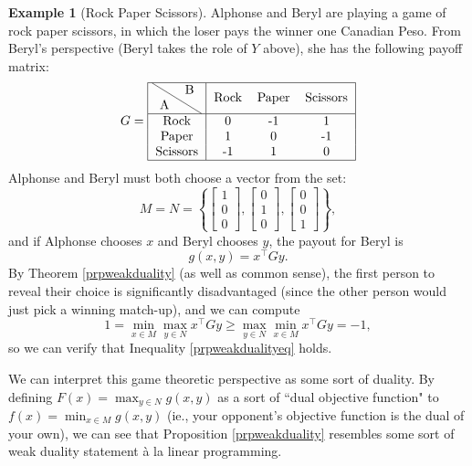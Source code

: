 \documentclass{article}
\numberwithin{equation}{section}
\theoremstyle{definition}
\newtheorem{example}[theorem]{Example}
\begin{document}
\begin{example}[Rock Paper Scissors]
    Alphonse and Beryl are playing a game of rock paper scissors, in which the loser pays the winner one Canadian Peso. From Beryl's perspective (Beryl takes the role of $Y$ above), she has the following payoff matrix:
    \begin{equation}
        G=\begin{tabular}{|c|ccc|}
            \hline
                \backslashbox{A}{B}&Rock&Paper&Scissors\\\hline 
                Rock & 0 & -1 & 1 \\
                Paper & 1 & 0 & -1 \\
                Scissors & -1 & 1 & 0\\\hline
            \end{tabular}
    \end{equation}
    Alphonse and Beryl must both choose a vector from the set:
    \begin{equation}
        M=N=\left\{\begin{bmatrix} 1\\ 0\\ 0\end{bmatrix},
        \begin{bmatrix} 0\\ 1\\ 0\end{bmatrix},
        \begin{bmatrix} 0\\ 0\\ 1\end{bmatrix}\right\},
    \end{equation}
    and if Alphonse chooses $x$ and Beryl chooses $y$, the payout for Beryl is
    \begin{equation}
        g(x,y)=x^\top Gy.
    \end{equation}
    By Theorem \ref{prpweakduality} (as well as common sense), the first person to reveal their choice is significantly disadvantaged (since the other person would just pick a winning match-up), and we can compute
    \begin{equation}
        1=\min_{x\in M}\max_{y\in N} x^\top Gy\ge \max_{y\in N}\min_{x\in M} x^\top Gy=-1,
    \end{equation}
    so we can verify that Inequality \ref{prpweakdualityeq} holds.
\end{example}

We can interpret this game theoretic perspective as some sort of duality. By defining  $F(x)=\max_{y\in N}g(x,y)$ as a sort of ``dual objective function" to $f(x)=\min_{x\in M} g(x,y)$ (ie., your opponent's objective function is the dual of your own), we can see that Proposition \ref{prpweakduality} resembles some sort of weak duality statement \`a la linear programming.
\end{document}
